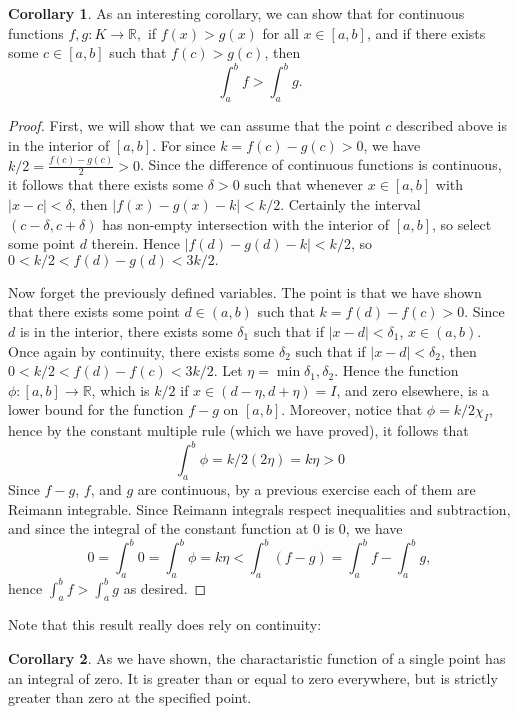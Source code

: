 \documentclass[12pt, letterpaper]{article}
\newcommand{\R}{\mathbb{R}}
\theoremstyle{definition}
\newtheorem{corollary}{Corollary}
\begin{document}
    \begin{corollary}
    As an interesting corollary, we can show that for continuous functions $ f,g:K\to \R,$ if $f(x) > g(x)$ for all $x\in [a,b]$, and if there exists some $c\in [a,b]$ such that $f(c) > g(c)$, then 
    \[
        \int_a^b f > \int_a^b g.
        \]
    \end{corollary}
    \begin{proof}
        First, we will show that we can assume that the point $c$ described above is in the interior of $[a,b]$. For since $k = f(c) - g(c) > 0$, we have $k/2 = \frac{f(c) - g(c)}{2} > 0$. Since the difference of continuous functions is continuous, it follows that there exists some $\delta > 0$ such that whenever $ x\in [a,b] $ with $ |x-c| < \delta $, then $ |f(x) - g(x) - k| < k/2 $. Certainly the interval $ (c - \delta, c + \delta) $ has non-empty intersection with the interior of $ [a,b] $, so select some point $d$ therein. Hence $|f(d) - g(d) - k| < k/2$, so $ 0 < k/2 < f(d) - g(d) < 3k/2 .$

        Now forget the previously defined variables. The point is that we have shown that there exists some point $d\in (a,b)$ such that $k = f(d) - f(c) > 0$. Since $d$ is in the interior, there exists some $\delta_1$ such that if $|x - d| < \delta_1$, $ x\in (a,b) $. Once again by continuity, there exists some $\delta_2$ such that if $|x - d| < \delta_2$, then $ 0 < k/2 < f(d) - f(c) < 3k/2$. Let $\eta = \min{\delta_1, \delta_2}$. Hence the function 
        $\phi:[a,b]\to \R$, which is $k/2$ if $ x\in (d - \eta, d+\eta) = I$, and zero elsewhere, is a lower bound for the function $f - g$ on $[a,b]$. Moreover, notice that $\phi = k/2\chi_I$, hence by the constant multiple rule (which we have proved), it follows that
        \[
            \int_a^b \phi = k/2(2\eta) = k\eta > 0
            \]
        Since $f-g$, $f$, and $g$ are continuous, by a previous exercise each of them are Reimann integrable. Since Reimann integrals respect inequalities and subtraction, and since the integral of the constant function at $0$ is $0$, we have
        \[
            0 = \int_a^b 0 = \int_a^b \phi = k\eta < \int_a^b (f-g) = \int_a^b f - \int_a^b g,
        \]
        hence $ \int_a^b f > \int_a^b g $ as desired.
    \end{proof}

    Note that this result really does rely on continuity:

    \begin{corollary}
        As we have shown, the charactaristic function of a single point has an integral of zero. It is greater than or equal to zero everywhere, but is strictly greater than zero at the specified point. 
    \end{corollary}
\end{document}
